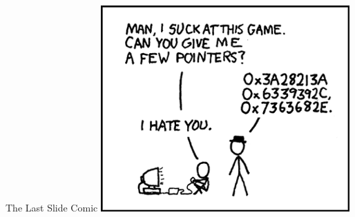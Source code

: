 \documentclass[11pt]{beamer}
\begin{document}
\begin{frame}{The Last Slide Comic}
\center
\includegraphics[scale=0.4]{pointers.png}
\end{frame}
\end{document}
